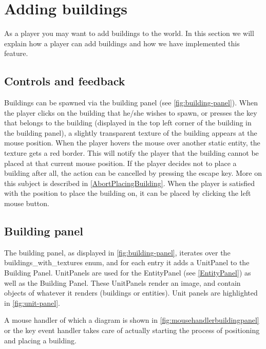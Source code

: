 \section{Adding buildings}
\label{sec:addingbuildings}
As a player you may want to add buildings to the world. In this section we will explain how a player can add buildings and how we have implemented this feature.

\subsection{Controls and feedback}
Buildings can be spawned via the building panel (see \cref{fig:building-panel}). When the player clicks on the building that he/she wishes to spawn, or presses the key that belongs to the building (displayed in the top left corner of the building in the building panel), a slightly transparent texture of the building appears at the mouse position. When the player hovers the mouse over another static entity, the texture gets a red border. This will notify the player that the building cannot be placed at that current mouse position. If the player decides not to place a building after all, the action can be cancelled by pressing the escape key. More on this subject is described in \cref{AbortPlacingBuilding}. When the player is satisfied with the position to place the building on, it can be placed by clicking the left mouse button. 

\subsection{Building panel}
The building panel, as displayed in \cref{fig:building-panel}, iterates over the buildings\_with\_textures enum, and for each entry it adds a UnitPanel to the Building Panel. UnitPanels are used for the EntityPanel (see \ref{EntityPanel}) as well as the Building Panel. These UnitPanels render an image, and contain objects of whatever it renders (buildings or entities). Unit panels are highlighted in \cref{fig:unit-panel}.

A mouse handler of which a diagram is shown in \cref{fig:mousehandlerbuildingpanel} or the key event handler takes care of actually starting the process of positioning and placing a building.

